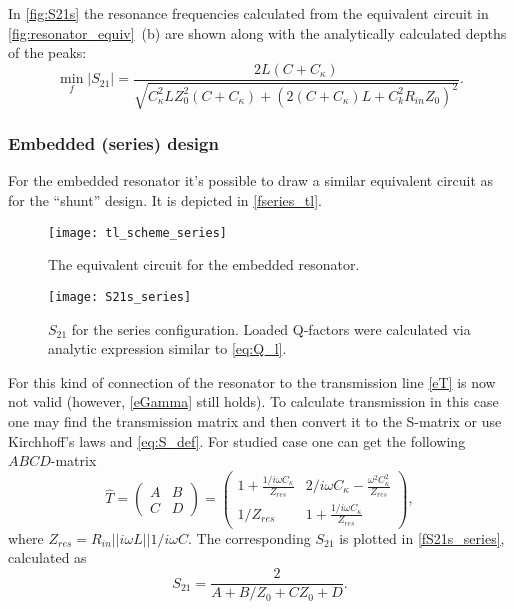 \documentclass[12pt, twoside]{report}
\newcommand{\rbrkt}[1]{\left( #1 \right)}
\numberwithin{equation}{section}
\begin{document}
In \autoref{fig:S21s} the resonance frequencies calculated from the equivalent circuit in \autoref{fig:resonator_equiv}~(b) are shown along with the analytically calculated depths of the peaks:
\begin{equation}
\min_f |S_{21}| = \frac{2 L \left(C + C_{\kappa}\right)}{\sqrt{C_{\kappa}^{2} L Z_{0}^{2} \left(C + C_{\kappa}\right) + \left(2 (C+C_\kappa) L + C_{k}^{2} R_{in} Z_{0} \right)^{2}}}.
\end{equation}

\subsubsection{Embedded (series) design}

For the embedded resonator it's possible to draw a similar equivalent circuit as for the ``shunt'' design\cite{Goppl2008}. It is depicted in \autoref{fseries_tl}. 

\begin{figure}[h]
\centering
\texttt{[image: tl\_scheme\_series]}
\caption{The equivalent circuit for the embedded resonator.}
\label{fseries_tl}
\end{figure}
\begin{figure}[h]
\centering
\texttt{[image: S21s\_series]}
\caption{$S_{21}$ for the series configuration. Loaded Q-factors were calculated  via analytic expression similar to \eqref{eq:Q_l}.}
\label{fS21s_series}
\end{figure}

For this kind of connection of the resonator to the transmission line \eqref{eT} is now not valid (however, \eqref{eGamma} still holds). To calculate transmission in this case one may find the transmission matrix and then convert it to the S-matrix or use Kirchhoff's laws and \eqref{eq:S_def}. For studied case one can get the following $ABCD$-matrix\cite{pozar2012}
\begin{equation}
\hat T = \rbrkt{\begin{matrix}
A & B \\
C & D
\end{matrix}} = \rbrkt{\begin{matrix}
1 + \frac{1/i\omega C_\kappa}{Z_{res}} & 2/i\omega C_\kappa - \frac{\omega^2 C_\kappa^2}{Z_{res}} \\
1/Z_{res} &  1 + \frac{1/i\omega C_\kappa}{Z_{res}} 
\end{matrix}},
\end{equation}
where $Z_{res} = R_{in}||i\omega L || 1/i\omega C$. The corresponding $S_{21}$ is plotted in \autoref{fS21s_series}, calculated as\cite{pozar2012} 
\begin{equation}
S_{21} = \frac{2}{A+B/Z_0 +CZ_0 + D}.
\end{equation}
\end{document}
